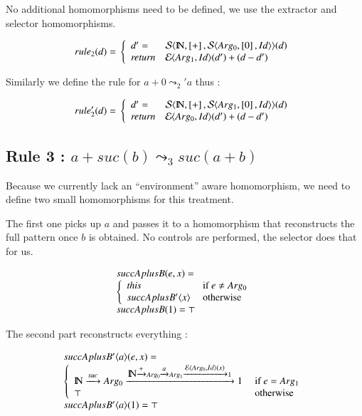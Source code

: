 No additional homomorphisms need to be defined, we use the extractor and selector homomorphisms.


$$
rule_2 (d) =  \\
\left\{\begin{array}{ll}
d' = &  {\cal S}\langle {\mbox{${\rm I\!N}$},\left[+\right],{\cal S}\ensuremath{\langle {Arg_0,\left[0\right],Id} \rangle}} \rangle (d) \\
\mathit{return} &  {\cal E}\langle {Arg_1,Id} \rangle (d') + (d-d')
 \end{array}
\right. \\
$$

Similarly we define the rule for  $a + 0 \leadsto_2' a$ thus :

$$
rule_2' (d) =  \\
\left\{\begin{array}{ll}
d' = &  {\cal S}\langle {\mbox{${\rm I\!N}$},\left[+\right],{\cal S}\ensuremath{\langle {Arg_1,\left[0\right],Id} \rangle}} \rangle (d) \\
\mathit{return} &  {\cal E}\langle {Arg_0,Id} \rangle (d') + (d-d')
 \end{array}
\right. \\
$$


\subsection{Rule 3 : $a + suc(b) \leadsto_3 suc (a + b)$}

Because we currently lack an ``environment'' aware homomorphism, we
need to define two small homomorphisms for this treatment.

The first one picks up $a$ and passes it to a homomorphism that
reconstructs the full pattern once $b$ is obtained.  No controls are
performed, the selector does that for us.


$$
\begin{array}{lcl}
{succAplusB} (e,x)= \\
\left\{\begin{array}{ll}
 \mathit{this} & \mbox{ if } e \neq Arg_0 \\
 succAplusB'\langle {x} \rangle  & \mbox{ otherwise } \\
\end{array}
\right. \\
 succAplusB (1) = \top 
\end{array}
$$

The second part reconstructs everything :

$$
\begin{array}{lcl}
{succAplusB'}\langle {a} \rangle (e,x)= \\
\left\{\begin{array}{ll}
\mbox{${\rm I\!N}$} \xrightarrow{\scriptstyle {suc}} {Arg_0} \xrightarrow{\scriptstyle {\mbox{${\rm I\!N}$}\ensuremath{\xrightarrow{\scriptstyle {+}}} {Arg_0} \ensuremath{\xrightarrow{\scriptstyle {a}}} {Arg_1} \ensuremath{\xrightarrow{\scriptstyle { {\cal E}\ensuremath{\langle {Arg_0,Id} \rangle}(x) }}} 1  }} 1 & \mbox{ if } e = Arg_1 \\
\top  & \mbox{ otherwise } \\
\end{array}
\right. \\
 succAplusB'\langle {a} \rangle (1) = \top 
\end{array}
$$

